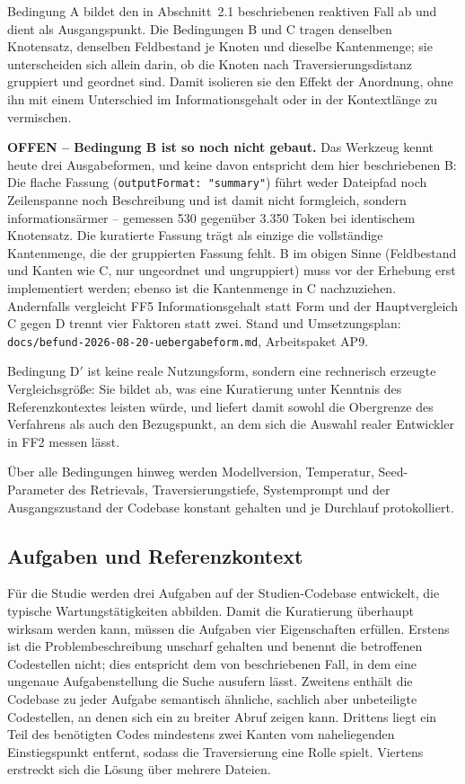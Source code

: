 Bedingung A bildet den in Abschnitt~2.1 beschriebenen reaktiven Fall ab und dient als Ausgangspunkt. Die Bedingungen B und C tragen denselben Knotensatz, denselben Feldbestand je Knoten und dieselbe Kantenmenge; sie unterscheiden sich allein darin, ob die Knoten nach Traversierungsdistanz gruppiert und geordnet sind. Damit isolieren sie den Effekt der Anordnung, ohne ihn mit einem Unterschied im Informationsgehalt oder in der Kontextlänge zu vermischen.

\begin{offen}
\textbf{OFFEN -- Bedingung B ist so noch nicht gebaut.} Das Werkzeug kennt heute drei Ausgabeformen, und keine davon entspricht dem hier beschriebenen B: Die flache Fassung (\texttt{outputFormat: "summary"}) führt weder Dateipfad noch Zeilenspanne noch Beschreibung und ist damit nicht formgleich, sondern informationsärmer -- gemessen 530 gegenüber 3.350 Token bei identischem Knotensatz. Die kuratierte Fassung trägt als einzige die vollständige Kantenmenge, die der gruppierten Fassung fehlt. B im obigen Sinne (Feldbestand und Kanten wie C, nur ungeordnet und ungruppiert) muss vor der Erhebung erst implementiert werden; ebenso ist die Kantenmenge in C nachzuziehen. Andernfalls vergleicht FF5 Informationsgehalt statt Form und der Hauptvergleich C gegen D trennt vier Faktoren statt zwei. Stand und Umsetzungsplan: \texttt{docs/befund-2026-08-20-uebergabeform.md}, Arbeitspaket AP9.
\end{offen} Bedingung D$'$ ist keine reale Nutzungsform, sondern eine rechnerisch erzeugte Vergleichsgröße: Sie bildet ab, was eine Kuratierung unter Kenntnis des Referenzkontextes leisten würde, und liefert damit sowohl die Obergrenze des Verfahrens als auch den Bezugspunkt, an dem sich die Auswahl realer Entwickler in FF2 messen lässt.

Über alle Bedingungen hinweg werden Modellversion, Temperatur, Seed-Parameter des Retrievals, Traversierungstiefe, Systemprompt und der Ausgangszustand der Codebase konstant gehalten und je Durchlauf protokolliert.

\subsection{Aufgaben und Referenzkontext}

Für die Studie werden drei Aufgaben auf der Studien-Codebase entwickelt, die typische Wartungstätigkeiten abbilden. Damit die Kuratierung überhaupt wirksam werden kann, müssen die Aufgaben vier Eigenschaften erfüllen. Erstens ist die Problembeschreibung unscharf gehalten und benennt die betroffenen Codestellen nicht; dies entspricht dem von \textcite{suri2026codescout} beschriebenen Fall, in dem eine ungenaue Aufgabenstellung die Suche ausufern lässt. Zweitens enthält die Codebase zu jeder Aufgabe semantisch ähnliche, sachlich aber unbeteiligte Codestellen, an denen sich ein zu breiter Abruf zeigen kann. Drittens liegt ein Teil des benötigten Codes mindestens zwei Kanten vom naheliegenden Einstiegspunkt entfernt, sodass die Traversierung eine Rolle spielt. Viertens erstreckt sich die Lösung über mehrere Dateien.

